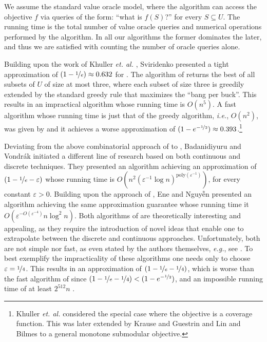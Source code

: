 \documentclass[a4paper]{article}
\begin{document}
We assume the standard value oracle model, where the algorithm can access the objective $f$ via queries of the form: ``what is $f(S)$?'' for every $S\subseteq U$.
The running time is the total number of value oracle queries and numerical operations performed by the algorithm. In all our algorithms the former dominates the later, and thus we are satisfied with counting the number of oracle queries alone.

Building upon the work of Khuller {\em et. al.} \cite{khuller1999budgeted}, Sviridenko \cite{sviridenko2004note} presented a tight approximation of $(1-\nicefrac[]{1}{e})\approx 0.632$ for \SK.
The algorithm of \cite{sviridenko2004note} returns the best of all subsets of $U$ of size at most three, where each subset of size three is greedily extended by the standard greedy rule that maximizes the ``bang per buck''.
This results in an impractical algorithm whose running time is $O(n^5)$.
A fast algorithm whose running time is just that of the greedy algorithm, {\em i.e.}, $O(n^2)$, was given by \cite{khuller1999budgeted} and it achieves a worse approximation of $(1-e^{-\nicefrac[]{1}{2}})\approx 0.393$.\footnote{Khuller {\em et. al.} \cite{khuller1999budgeted} considered the special case where the objective is a coverage function. This was later extended by Krause and Guestrin \cite{krause2005note} and Lin and Bilmes \cite{LB10} to a general monotone submodular objective.}


Deviating from the above combinatorial approach of \cite{khuller1999budgeted,sviridenko2004note} to \SK, Badanidiyuru and Vondr\'{a}k \cite{badanidiyuru2014fast} initiated a different line of research based on both continuous and discrete techniques.
They presented an algorithm achieving an approximation of $(1-\nicefrac[]{1}{e}-\varepsilon)$ whose running time is $O(n^2(\varepsilon ^{-1}\log n)^{\text{poly}(\varepsilon^{-1})})$, for every constant $\varepsilon >0$.
Building upon the approach of \cite{badanidiyuru2014fast}, Ene and Nguy\~{\^{e}}n \cite{Alina2017} presented an algorithm achieving the same approximation guarantee whose running time it $O(\varepsilon^{-O(\varepsilon^{-4})}n \log^2 n)$.
Both algorithms of \cite{badanidiyuru2014fast,Alina2017} are theoretically interesting and appealing, as they require the introduction of novel ideas that enable one to extrapolate between the discrete and continuous approaches.
Unfortunately, both are not simple nor fast, as even stated by the authors themselves, {\em e.g.}, see \cite{Alina2017}.
To best exemplify the impracticality of these algorithms one needs only to choose $\varepsilon = \nicefrac[]{1}{4}$.
This results in an approximation of $(1-\nicefrac[]{1}{e}-\nicefrac[]{1}{4})$, which is worse than the fast algorithm of \cite{khuller1999budgeted} since $(1-\nicefrac[]{1}{e}-\nicefrac[]{1}{4})<(1-e^{-\nicefrac[]{1}{2}})$, and an impossible running time of at least $2^{512} n$ \cite{Alina2017}.
\end{document}
